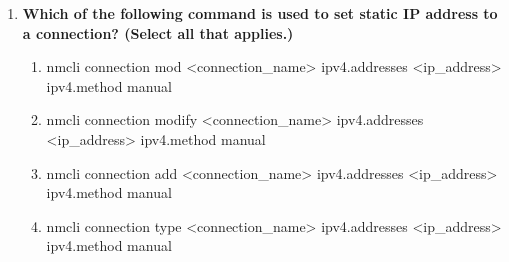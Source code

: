 \begin{flushleft}
\begin{enumerate}
		
		\item \textbf{Which of the following command is used to set static IP address to a connection? (Select all that applies.)}
		\begin{enumerate}[label=(\alph*)]
			\item nmcli connection mod <connection\_name> ipv4.addresses <ip\_address> ipv4.method manual   %
			\item nmcli connection modify <connection\_name> ipv4.addresses <ip\_address> ipv4.method manual  %
			\item nmcli connection add <connection\_name> ipv4.addresses <ip\_address> ipv4.method manual
			\item nmcli connection type <connection\_name> ipv4.addresses <ip\_address> ipv4.method manual
		\end{enumerate}
		\bigskip
		\bigskip	
		
		
	\end{enumerate}
\end{flushleft}

\newpage

